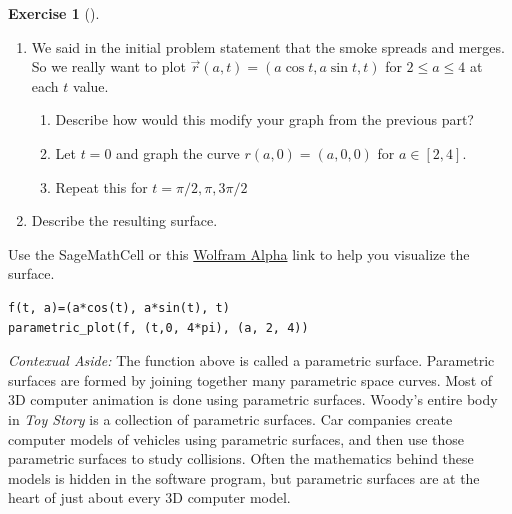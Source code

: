 \documentclass[10pt,]{book}
\theoremstyle{plain}
\theoremstyle{definition}
\theoremstyle{definition}
\theoremstyle{definition}
\theoremstyle{definition}
\newtheorem{exploration}[project]{Exercise}
\theoremstyle{definition}
\numberwithin{equation}{section}
\begin{document}
\begin{exploration}[]
\begin{enumerate}[font=\bfseries,label=(\alph*),ref=\alph*]
\begin{enumerate}[font=\bfseries,label=(\roman*),ref=\theenumi.\roman*]
\end{enumerate}
\item\label{task-185} We said in the initial problem statement that the smoke spreads and merges. So we really want to plot \(\vec{r}(a,t)=(a\cos t, a\sin t, t)\) for \(2\leq a \leq 4\) at each \(t\) value.%
\begin{enumerate}[font=\bfseries,label=(\roman*),ref=\theenumi.\roman*]
\item\label{task-186} Describe how would this modify your graph from the previous part?%
\item\label{task-187} Let \(t=0\) and graph the curve \(r(a,0)=(a,0,0)\) for \(a\in[2,4]\).%
\item\label{task-188} Repeat this for \(t=\pi/2,\pi,3\pi/2\)%
\end{enumerate}
\item\label{task-189} Describe the resulting surface.%
\end{enumerate}
\bigbreak
Use the SageMathCell or this \href{http://www.wolframalpha.com/input/?i=parametric+plot+3D++\%28a+cos+t\%2C+a+sin+t\%2C+t\%29+for+t+from+0+to+4+pi+and+a+from+2+to+4}{Wolfram Alpha} link to help you visualize the surface.%
\begin{lstlisting}[style=sageinput]
f(t, a)=(a*cos(t), a*sin(t), t)
parametric_plot(f, (t,0, 4*pi), (a, 2, 4))
\end{lstlisting}
\end{exploration}
\emph{Contexual Aside:} The function above is called a parametric surface. Parametric surfaces are formed by joining together many parametric space curves. Most of 3D computer animation is done using parametric surfaces. Woody's entire body in \emph{Toy Story} is a collection of parametric surfaces. Car companies create computer models of vehicles using parametric surfaces, and then use those parametric surfaces to study collisions. Often the mathematics behind these models is hidden in the software program, but parametric surfaces are at the heart of just about every 3D computer model.%
\end{document}
